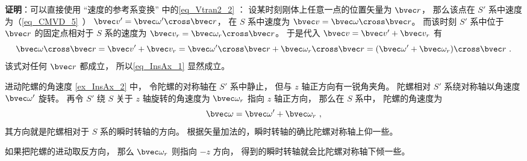 \textbf{证明}：可以直接使用 “速度的参考系变换” 中的\autoref{eq_Vtran2_2} ： 设某时刻刚体上任意一点的位置矢量为 $\bvec r$， 那么该点在 $S'$ 系中速度为（\autoref{eq_CMVD_5}~） $\bvec v' = \bvec\omega'\cross\bvec r$， 在 $S$ 系中速度为 $\bvec v = \bvec\omega\cross\bvec r$。 而该时刻 $S'$ 系中位于 $\bvec r$ 的固定点相对于 $S$ 系的速度为 $\bvec v_r = \bvec\omega_r\cross\bvec r$。 于是代入 $\bvec v = \bvec v' + \bvec v_r$ 有
\begin{equation}
\bvec\omega\cross\bvec r = \bvec v' + \bvec v_r = \bvec\omega'\cross\bvec r + \bvec\omega_r\cross\bvec r
= (\bvec\omega' + \bvec\omega_r)\cross\bvec r~.
\end{equation}
该式对任何 $\bvec r$ 都成立， 所以\autoref{eq_InsAx_1} 显然成立。

\begin{example}{进动陀螺的角速度}\label{ex_InsAx_1}
\autoref{ex_InsAx_2} 中， 令陀螺的对称轴在 $S'$ 系中静止， 但与 $z$ 轴正方向有一锐角夹角。 陀螺相对 $S'$ 系绕对称轴以角速度 $\bvec \omega'$ 旋转。 再令 $S'$ 绕 $S$ 关于 $z$ 轴旋转的角速度为 $\bvec \omega_r$ 指向 $z$ 轴正方向， 那么在 $S$ 系中， 陀螺的角速度为
\begin{equation}
\bvec \omega = \bvec \omega' + \bvec \omega_r~,
\end{equation}
其方向就是陀螺相对于 $S$ 系的瞬时转轴的方向。 根据矢量加法的，瞬时转轴的确比陀螺对称轴上仰一些。

如果把陀螺的进动取反方向， 那么 $\bvec \omega_r$ 则指向 $-z$ 方向， 得到的瞬时转轴就会比陀螺对称轴下倾一些。
\end{example}
